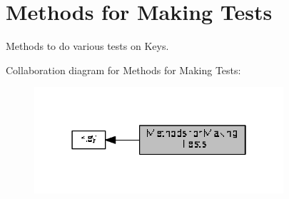\hypertarget{group__keytest}{}\section{Methods for Making Tests}
\label{group__keytest}


Methods to do various tests on Keys.  


Collaboration diagram for Methods for Making Tests\+:
\nopagebreak
\begin{figure}[H]
\begin{center}
\leavevmode
\includegraphics[width=262pt]{group__keytest}
\end{center}
\end{figure}
